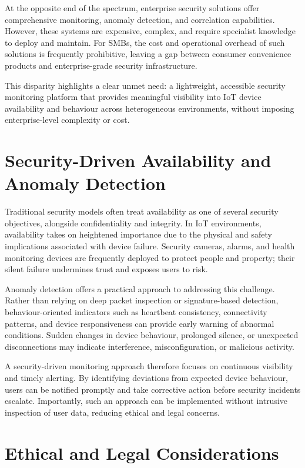 At the opposite end of the spectrum, enterprise security solutions offer comprehensive monitoring, anomaly detection, and correlation capabilities. However, these systems are expensive, complex, and require specialist knowledge to deploy and maintain. For SMBs, the cost and operational overhead of such solutions is frequently prohibitive, leaving a gap between consumer convenience products and enterprise-grade security infrastructure.

This disparity highlights a clear unmet need: a lightweight, accessible security monitoring platform that provides meaningful visibility into IoT device availability and behaviour across heterogeneous environments, without imposing enterprise-level complexity or cost.

\section{Security-Driven Availability and Anomaly Detection}

Traditional security models often treat availability as one of several security objectives, alongside confidentiality and integrity. In IoT environments, availability takes on heightened importance due to the physical and safety implications associated with device failure. Security cameras, alarms, and health monitoring devices are frequently deployed to protect people and property; their silent failure undermines trust and exposes users to risk.

Anomaly detection offers a practical approach to addressing this challenge. Rather than relying on deep packet inspection or signature-based detection, behaviour-oriented indicators such as heartbeat consistency, connectivity patterns, and device responsiveness can provide early warning of abnormal conditions. Sudden changes in device behaviour, prolonged silence, or unexpected disconnections may indicate interference, misconfiguration, or malicious activity.

A security-driven monitoring approach therefore focuses on continuous visibility and timely alerting. By identifying deviations from expected device behaviour, users can be notified promptly and take corrective action before security incidents escalate. Importantly, such an approach can be implemented without intrusive inspection of user data, reducing ethical and legal concerns.

\section{Ethical and Legal Considerations}

